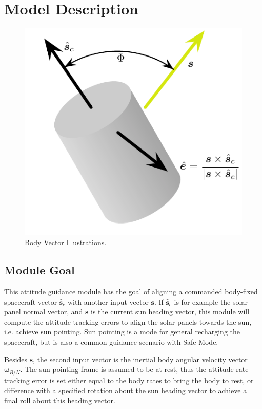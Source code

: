 
\section{Model Description}

\begin{figure}[t]
	\centerline{
		\includegraphics{Figures/sunHeading}
	}
	\caption{Body Vector Illustrations.}
	\label{fig:Fig1}
\end{figure}

\subsection{Module Goal}
This attitude guidance module has the goal of aligning a commanded body-fixed spacecraft vector $\hat{\bm s}_{c}$ with another input vector $\bm s$.  If $\hat{\bm s}_{c}$ is for example the solar panel normal vector, and $\bm s$ is the current sun heading vector, this module will compute the attitude tracking errors to align the solar panels towards the sun, i.e. achieve sun pointing.  Sun pointing is a mode for general recharging the spacecraft, but is also a common guidance scenario with Safe Mode.  

Besides $\bm s$, the second input vector is the inertial body angular velocity vector $\bm\omega_{B/N}$.  The sun pointing frame is assumed to be at rest, thus the attitude rate tracking error is set either equal to the body rates to bring the body to rest, or difference with a specified rotation about the sun heading vector to achieve a final roll about this heading vector.  

